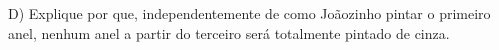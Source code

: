 \documentclass[preview]{standalone}
\begin{document}
\begin{center}
D) Explique por que, independentemente de como Joãozinho pintar o primeiro anel, nenhum anel a partir do terceiro será
totalmente pintado de cinza.
\end{center}
\end{document}
